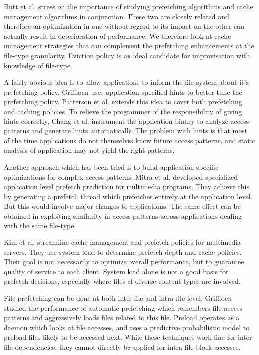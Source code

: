 \documentclass[twocolumn,10pt]{article}
\begin{document}
Butt et al. \cite{7} stress on the importance of studying prefetching algorithms
and cache management algorithms in conjunction. These two are closely related
and therefore an optimization in one without regard to its impact on the
other can actually result in deterioration of performance. We therefore
look at cache management strategies that can complement the prefetching
enhancements at the file-type granularity. Eviction policy is an ideal
candidate for improvisation with knowledge of file-type.

A fairly obvious idea is to allow applications to inform the file system
about it's prefetching policy. Griffioen \cite{3} uses application
specified hints to better tune the prefetching policy. Patterson et al.
\cite{4} extends this idea to cover both prefetching and caching policies.
To relieve the programmer of the responsibility of giving hints correctly,
Chang et al. \cite{5} instrument the application binary to analyze access
patterns and generate hints automatically.
The problem with hints is that most of the time applications do not themselves
know future access patterns, and static analysis of application may not
yield the right patterns.

Another approach which has been tried is to build application specific
optimizations for complex access patterns. Mitra et al. \cite{8} 
developed specialized application level prefetch prediction for
multimedia programs. They achieve this by generating a prefetch
thread which prefetches entirely at the application level. But
this would involve major changes to applications. The same effect
can be obtained in exploiting similarity in access patterns across
applications dealing with the same file-type.

Kim et al. \cite{10} streamline cache management and prefetch policies
for multimedia servers. They use system load to determine prefetch
depth and cache policies. Their goal is not necessarily to optimize
overall performance, but to guarantee quality of service to each
client. System load alone is not a good basis for prefetch decisions,
especially where files of diverse content types are involved.

File prefetching can be done at both inter-file and intra-file level.
Griffioen \cite{12} studied the performance of automatic prefetching
which remembers file access patterns and aggressively loads files 
related to this file. Preload \cite{11} operates as a daemon which looks at
file accesses, and uses a predictive probabilistic model to preload
files likely to be accessed next. While these techniques work fine
for inter-file dependencies, they cannot directly be applied for
intra-file block accesses.
\end{document}
